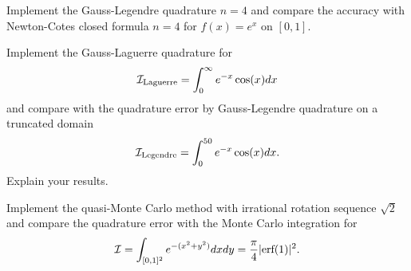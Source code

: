 \begin{problem}
    Implement the Gauss-Legendre quadrature $n=4$ and compare the accuracy with Newton-Cotes closed formula $n=4$ for $f(x) = e^x$ on $[0, 1]$.
\end{problem}
\begin{problem}
    Implement the Gauss-Laguerre quadrature for 
    \begin{equation}
        \mathcal I_{\textrm{Laguerre}} = \int_0^{\infty} e^{-x} \cos(x) dx 
    \end{equation}
    and compare with the quadrature error by Gauss-Legendre quadrature on a truncated domain 
    \begin{equation}
        \mathcal I_{\textrm{Legendre}} = \int_{0}^{50} e^{-x} \cos(x) dx.
    \end{equation}
    Explain your results.
\end{problem}
\begin{problem}
    Implement the quasi-Monte Carlo method with irrational rotation sequence $\sqrt{2}$ and compare the quadrature error with the Monte Carlo integration for  
    $$\mathcal I = \int_{[0, 1]^2} e^{ -(x^2 + y^2) } dx d y = \frac{\pi}{4} |\textrm{erf}(1)|^2. $$
\end{problem}



